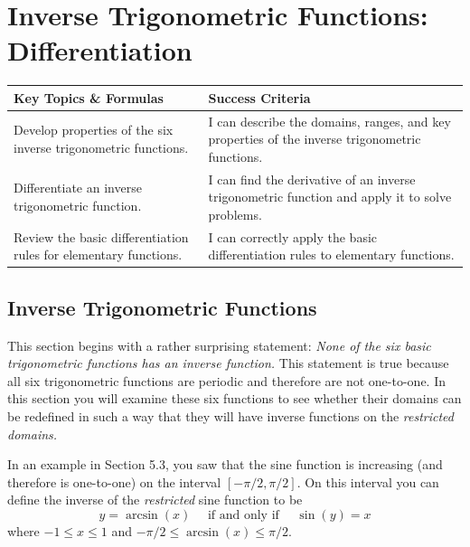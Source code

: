 \documentclass[12pt, letterpaper]{article}
\begin{document}
\section{Inverse Trigonometric Functions: Differentiation}
\begin{objectives}
    \renewcommand{\arraystretch}{1.5} %
    \begin{tabularx}{\textwidth}{@{} >{\raggedright\arraybackslash}X >{\raggedright\arraybackslash}X @{}}
        
        \textbf{Key Topics \& Formulas} & \textbf{Success Criteria} \\ 
        \midrule[1.5pt] %
        
        Develop properties of the six inverse trigonometric functions.
        & I can describe the domains, ranges, and key properties of the inverse trigonometric functions. \\
        \midrule %
        
        Differentiate an inverse trigonometric function.
        & I can find the derivative of an inverse trigonometric function and apply it to solve problems. \\
        \midrule

        Review the basic differentiation rules for elementary functions.
        & I can correctly apply the basic differentiation rules to elementary functions.
    \end{tabularx}
\end{objectives}


\subsection{Inverse Trigonometric Functions}
This section begins with a rather surprising statement: \textit{None of the six basic trigonometric functions has an inverse function.} This statement is true because all six
trigonometric functions are periodic and therefore are not one-to-one. In this section
you will examine these six functions to see whether their domains can be redefined in
such a way that they will have inverse functions on the \textit{restricted domains.}

In an example in Section 5.3, you saw that the sine function is increasing (and
therefore is one-to-one) on the interval $[-\pi/2, \pi/2]$. On this interval you can define the inverse of the \textit{restricted} sine function to be 
$$y=\arcsin(x) \quad \text{ if and only if } \quad \sin(y)=x$$
where $-1\leq x\leq 1$ and $-\pi/2 \leq \arcsin(x) \leq \pi/2$.
\end{document}
